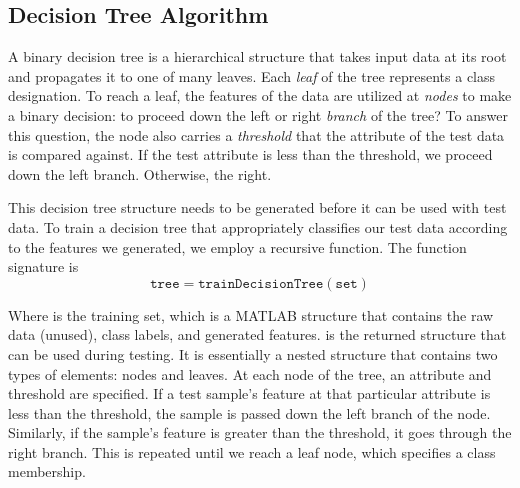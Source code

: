 \subsection{Decision Tree Algorithm}

A binary decision tree is a hierarchical structure that takes input data at its root and propagates it to one of many leaves. Each \emph{leaf} of the tree represents a class designation. To reach a leaf, the features of the data are utilized at \emph{nodes} to make a binary decision: to proceed down the left or right \emph{branch} of the tree? To answer this question, the node also carries a \emph{threshold} that the attribute of the test data is compared against. If the test attribute is less than the threshold, we proceed down the left branch. Otherwise, the right. 

This decision tree structure needs to be generated before it can be used with test data. To train a decision tree that appropriately classifies our test data according to the features we generated, we employ a recursive function. The function signature is
%
\begin{equation*}
  \mathtt{tree = trainDecisionTree(set)}
\end{equation*}

Where  is the training set, which is a MATLAB structure that contains the raw data (unused), class labels, and generated features.  is the returned structure that can be used during testing. It is essentially a nested structure that contains two types of elements: nodes and leaves. At each node of the tree, an attribute and threshold are specified. If a test sample's feature at that particular attribute is less than the threshold, the sample is passed down the left branch of the node. Similarly, if the sample's feature is greater than the threshold, it goes through the right branch. This is repeated until we reach a leaf node, which specifies a class membership. 

